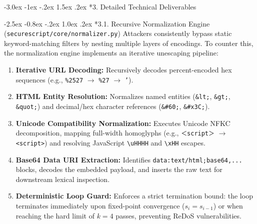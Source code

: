 \documentclass[11pt,a4paper]{article}
\makeatletter
\renewcommand{\section}{\@startsection{section}{1}{\z@}%
  {-3.0ex \@plus -1ex \@minus -.2ex}%
  {1.5ex \@plus .2ex}%
  {\normalfont\large\bfseries\color{primaryblue}}}
\renewcommand{\subsection}{\@startsection{subsection}{2}{\z@}%
  {-2.5ex \@plus -0.8ex \@minus -.2ex}%
  {1.0ex \@plus .2ex}%
  {\normalfont\normalsize\bfseries\color{secondaryblue}}}
\makeatother
\begin{document}
\section*{3. Detailed Technical Deliverables}

\subsection*{3.1. Recursive Normalization Engine (\texttt{securescript/core/normalizer.py})}
Attackers consistently bypass static keyword-matching filters by nesting multiple layers of encodings. To counter this, the normalization engine implements an iterative unescaping pipeline:
\begin{enumerate}[label=\textbf{\arabic*.}]
    \item \textbf{Iterative URL Decoding:} Recursively decodes percent-encoded hex sequences (e.g., \texttt{\%2527} $\rightarrow$ \texttt{\%27} $\rightarrow$ \texttt{'}).
    \item \textbf{HTML Entity Resolution:} Normalizes named entities (\texttt{\&lt;}, \texttt{\&gt;}, \texttt{\&quot;}) and decimal/hex character references (\texttt{\&\#60;}, \texttt{\&\#x3C;}).
    \item \textbf{Unicode Compatibility Normalization:} Executes Unicode NFKC decomposition, mapping full-width homoglyphs (e.g., \texttt{＜script＞} $\rightarrow$ \texttt{<script>}) and resolving JavaScript \texttt{\textbackslash uHHHH} and \texttt{\textbackslash xHH} escapes.
    \item \textbf{Base64 Data URI Extraction:} Identifies \texttt{data:text/html;base64,...} blocks, decodes the embedded payload, and inserts the raw text for downstream lexical inspection.
    \item \textbf{Deterministic Loop Guard:} Enforces a strict termination bound: the loop terminates immediately upon fixed-point convergence ($s_i = s_{i-1}$) or when reaching the hard limit of $k = 4$ passes, preventing ReDoS vulnerabilities.
\end{enumerate}
\end{document}
